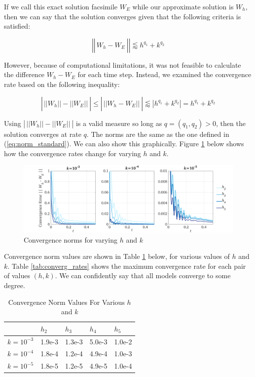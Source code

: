 \documentclass[12pt]{article}
\begin{document}
If we call this exact solution facsimile $W_E$ while our approximate solution is $W_h$, then we can say that the solution converges given that the following criteria is satisfied:

\begin{equation}
\left|\left|\frac{}{} W_h - W_E ~\right|\right| \lessapprox h^{q_1} + k^{q_2} 
\end{equation}

However, because of computational limitations, it was not feasible to calculate the difference $W_h-W_E$ for each time step. Instead, we examined the convergence rate based on the following inequality:

\begin{equation}
\left|\frac{}{} ||W_h|| - ||W_E|| ~\right| \leq \left|\frac{}{} || W_h - W_E|| ~ \right|  \lessapprox \left|h^{q_1} + k^{q_2}\right| = h^{q_1} + k^{q_2}
\end{equation}

\noindent Using $\left|\frac{}{} ||W_h|| - ||W_E|| ~\right|$ is a valid measure so long as $q=(q_1,q_2) > 0$, then the solution converges at rate $q$. The norms are the same as the one defined in (\ref{eq:norm_standard}). We can also show this graphically. Figure \ref{fig:convergence} below shows how the convergence rates change for varying $h$ and $k$. 

\begin{figure}[H]
	\includegraphics[width=\linewidth, trim=2.5cm 0 .5cm 0,clip]{images/norms_1.png}
	\caption{Convergence norms for varying $h$ and $k$}\label{fig:convergence}
\end{figure}

Convergence norm values are shown in Table \ref{tab:converg_norms} below, for various values of $h$ and $k$. Table \ref{tab:converg_rates} shows the maximum convergence rate for each pair of values $(h,k)$. We can confidently say that all models converge to some degree.

\begin{table}[H]
	\caption{Convergence Norm Values For Various $h$ and $k$}\label{tab:converg_norms}
	\centering
	\begin{tabular}{|l|l|l|l|l|}
		\hline
					& $h_2$  & $h_3$  & $h_4$  & $h_5$  \\ \hline
		$k=10^{-3}$ & 1.9e-3 & 1.3e-3 & 5.0e-3 & 1.0e-2 \\ \hline
		$k=10^{-4}$ & 1.8e-4 & 1.2e-4 & 4.9e-4 & 1.0e-3 \\ \hline
		$k=10^{-5}$ & 1.8e-5 & 1.2e-5 & 4.9e-5 & 1.0e-4 \\ \hline
	\end{tabular}
\end{table}
\end{document}
